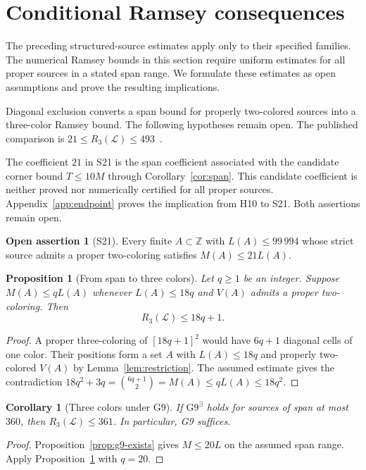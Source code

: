 \documentclass[11pt,a4paper]{article}
\newif\ifshowrevisions
\newenvironment{revision}{\par\begingroup\ifshowrevisions\color{red}\fi}{\par\endgroup}
\newtheorem{proposition}[theorem]{Proposition}
\newtheorem{corollary}[theorem]{Corollary}
\theoremstyle{definition}
\newtheorem{assertion}[theorem]{Open assertion}
\newcommand{\Lconf}{\mathcal L}
\newcommand{\Z}{\mathbb Z}
\numberwithin{equation}{section}
\begin{document}
\section{Conditional Ramsey consequences}\label{sec:conditional}
\begin{revision}
The preceding structured-source estimates apply only to their specified families. The numerical Ramsey bounds in this section require uniform estimates for all proper sources in a stated span range. We formulate these estimates as open assumptions and prove the resulting implications.
\end{revision}
Diagonal exclusion converts a span bound for properly two-colored sources into a three-color Ramsey bound. The following hypotheses remain open. The published comparison is $21\le R_3(\Lconf)\le493$~\cite{CCFGMS23,MSY25}.

\begin{revision}
The coefficient $21$ in S21 is the span coefficient associated with the candidate corner bound $T\le10M$ through Corollary~\ref{cor:span}. This candidate coefficient is neither proved nor numerically certified for all proper sources. Appendix~\ref{app:endpoint} proves the implication from H10 to S21. Both assertions remain open.
\end{revision}

\begin{assertion}[S21]\label{open:s21}
Every finite $A\subset\Z$ with $L(A)\le99\,994$ whose strict source admits a proper two-coloring satisfies $M(A)\le21L(A)$.
\end{assertion}

\begin{proposition}[From span to three colors]\label{prop:span-r3}
Let $q\ge1$ be an integer. Suppose $M(A)\le qL(A)$ whenever $L(A)\le18q$ and $V(A)$ admits a proper two-coloring. Then
\begin{equation}\label{eq:span-Ramsey}
 R_3(\Lconf)\le18q+1.
\end{equation}
\end{proposition}
\begin{proof}
A proper three-coloring of $[18q+1]^2$ would have $6q+1$ diagonal cells of one color. Their positions form a set $A$ with $L(A)\le18q$ and properly two-colored $V(A)$ by Lemma~\ref{lem:restriction}. The assumed estimate gives the contradiction
$18q^2+3q=\binom{6q+1}{2}=M(A)\le qL(A)\le18q^2$.
\end{proof}

\begin{corollary}[Three colors under G9]\label{cor:g9-three}
If $\mathrm{G9}^{\exists}$ holds for sources of span at most $360$, then $R_3(\Lconf)\le361$. In particular, G9 suffices.
\end{corollary}
\begin{proof}
Proposition~\ref{prop:g9-exists} gives $M\le20L$ on the assumed span range. Apply Proposition~\ref{prop:span-r3} with $q=20$.
\end{proof}
\end{document}

